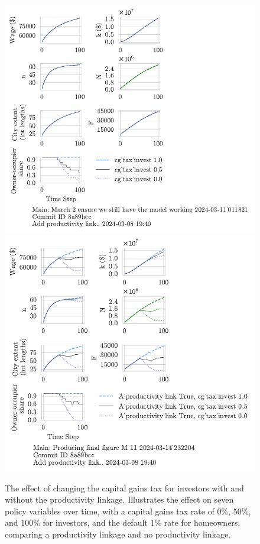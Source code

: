 \begin{figure}[h!tb] 
    \centering
    \includegraphics[scale=.75, trim={0 1.4cm 4.5cm 0},clip]{fig/cg_tax_invest-Main-011821.pdf} 
    \includegraphics[scale=.75, trim={0 1.4cm 3.7cm 0},clip]{fig/With-productivity_linkcg_tax_invest-232204.pdf} 
    \caption[The effect of changing the capital gains tax for investors with and without the productivity linkage]{The effect of changing the capital gains tax for investors with and without the productivity linkage. Illustrates the effect on seven policy variables over time, with a capital gains tax rate of 0\%, 50\%, and 100\% for investors, and the default 1\% rate for homeowners, comparing a productivity linkage and no productivity linkage.}
    \label{fig:CG-invest_link_W-WO-Cost-of-capital}
\end{figure}

